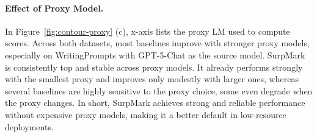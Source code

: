 \documentclass{article}
\theoremstyle{plain}
\theoremstyle{definition}
\theoremstyle{remark}
\begin{document}
\vspace{-3mm}
\paragraph{Effect of Proxy Model.} In Figure~\ref{fig:contour-proxy} (c), x-axis lists the proxy LM used to compute scores. Across both datasets, most baselines improve with stronger proxy models, especially on WritingPrompts with GPT-5-Chat as the source model. SurpMark is consistently top and stable across proxy models. It already performs strongly with the smallest proxy and improves only modestly with larger ones, whereas several baselines are highly sensitive to the proxy choice, some even degrade when the proxy changes. In short, SurpMark achieves strong and reliable performance without expensive proxy models, making it a better default in low-resource deployments.

\vspace{-3mm}
\end{document}
